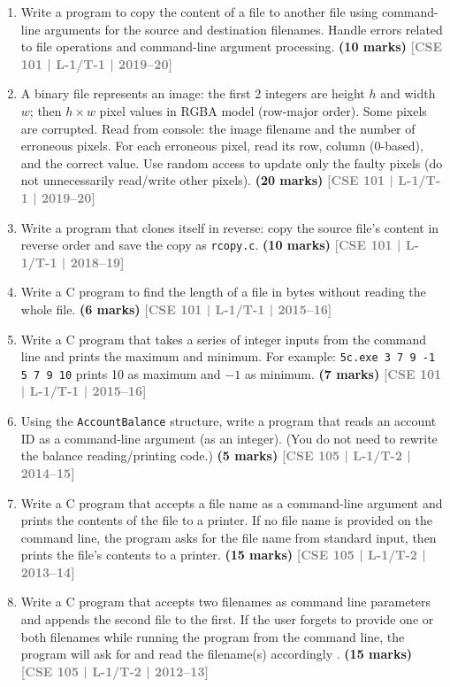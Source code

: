 \documentclass[12pt,a3paper]{article}
\newcommand{\yr}[1]{\hfill\textcolor{gray}{\small\textbf{[#1]}}}
\newcommand{\mk}[1]{\textcolor{orange!70!black}{\small\textbf{(#1 marks)}}}
\begin{document}
\begin{enumerate}
\item Write a program to copy the content of a file to another file using command-line arguments for the source and destination filenames. Handle errors related to file operations and command-line argument processing.
\mk{10} \yr{CSE 101 | L-1/T-1 | 2019--20}

\item A binary file represents an image: the first 2 integers are height $h$ and width $w$; then $h \times w$ pixel values in RGBA model (row-major order). Some pixels are corrupted. Read from console: the image filename and the number of erroneous pixels. For each erroneous pixel, read its row, column (0-based), and the correct value. Use random access to update only the faulty pixels (do not unnecessarily read/write other pixels).
\mk{20} \yr{CSE 101 | L-1/T-1 | 2019--20}

\item Write a program that clones itself in reverse: copy the source file's content in reverse order and save the copy as \texttt{rcopy.c}.
\mk{10} \yr{CSE 101 | L-1/T-1 | 2018--19}

\item Write a C program to find the length of a file in bytes without reading the whole file.
\mk{6} \yr{CSE 101 | L-1/T-1 | 2015--16}

\item Write a C program that takes a series of integer inputs from the command line and prints the maximum and minimum. For example: \texttt{5c.exe 3 7 9 -1 5 7 9 10} prints 10 as maximum and $-1$ as minimum.
\mk{7} \yr{CSE 101 | L-1/T-1 | 2015--16}

\item Using the \texttt{AccountBalance} structure, write a program that reads an account ID as a command-line argument (as an integer). (You do not need to rewrite the balance reading/printing code.)
\mk{5} \yr{CSE 105 | L-1/T-2 | 2014--15}

\item Write a C program that accepts a file name as a command-line argument and prints the contents of the file to a printer. If no file name is provided on the command line, the program asks for the file name from standard input, then prints the file's contents to a printer.
\mk{15} \yr{CSE 105 | L-1/T-2 | 2013--14}

\item Write a C program that accepts two filenames as command line parameters and
appends the second file to the first. If the user forgets to provide one or both filenames
while running the program from the command line, the program will ask for and read the
filename(s) accordingly .
\mk{15} \yr{CSE 105 | L-1/T-2 | 2012--13}


\end{enumerate}
\end{document}
